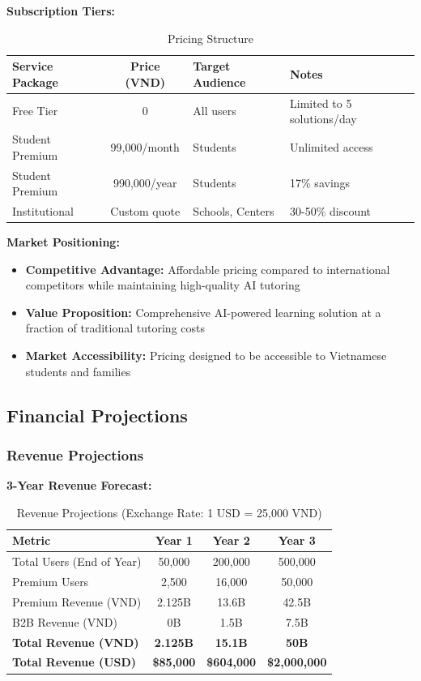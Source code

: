 \textbf{Subscription Tiers:}
\begin{table}[h]
\centering
\begin{tabular}{|l|c|l|l|}
\hline
\textbf{Service Package} & \textbf{Price (VND)} & \textbf{Target Audience} & \textbf{Notes} \\
\hline
Free Tier & 0 & All users & Limited to 5 solutions/day \\
Student Premium & 99,000/month & Students & Unlimited access \\
Student Premium & 990,000/year & Students & 17\% savings \\
Institutional & Custom quote & Schools, Centers & 30-50\% discount \\
\hline
\end{tabular}
\caption{Pricing Structure}
\end{table}

\textbf{Market Positioning:}
\begin{itemize}
    \item \textbf{Competitive Advantage:} Affordable pricing compared to international competitors while maintaining high-quality AI tutoring
    \item \textbf{Value Proposition:} Comprehensive AI-powered learning solution at a fraction of traditional tutoring costs
    \item \textbf{Market Accessibility:} Pricing designed to be accessible to Vietnamese students and families
\end{itemize}

\subsection{Financial Projections}
\subsubsection{Revenue Projections}
\textbf{3-Year Revenue Forecast:}
\begin{table}[h]
\centering
\begin{tabular}{|l|c|c|c|}
\hline
\textbf{Metric} & \textbf{Year 1} & \textbf{Year 2} & \textbf{Year 3} \\
\hline
Total Users (End of Year) & 50,000 & 200,000 & 500,000 \\
Premium Users & 2,500 & 16,000 & 50,000 \\
Premium Revenue (VND) & 2.125B & 13.6B & 42.5B \\
B2B Revenue (VND) & 0B & 1.5B & 7.5B \\
\hline
\textbf{Total Revenue (VND)} & \textbf{2.125B} & \textbf{15.1B} & \textbf{50B} \\
\textbf{Total Revenue (USD)} & \textbf{\$85,000} & \textbf{\$604,000} & \textbf{\$2,000,000} \\
\hline
\end{tabular}
\caption{Revenue Projections (Exchange Rate: 1 USD = 25,000 VND)}
\end{table}

